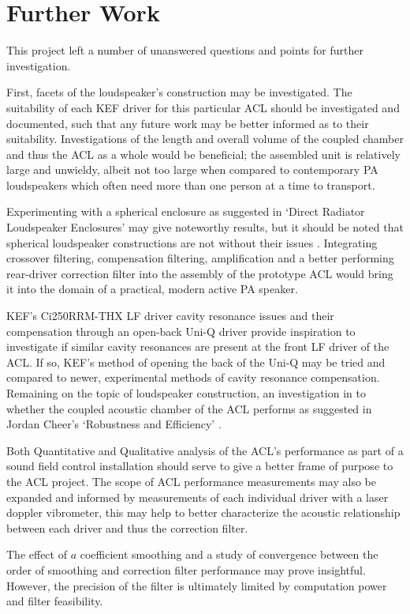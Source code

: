 \documentclass{report}
\begin{document}
\chapter{Further Work}
    This project left a number of unanswered questions and points for further investigation.

    First, facets of the loudspeaker's construction may be investigated.
    The suitability of each KEF driver for this particular ACL should be investigated and documented, such that any future work may be better informed as to their suitability.
    Investigations of the length and overall volume of the coupled chamber and thus the ACL as a whole would be beneficial; the assembled unit is relatively large and unwieldy, albeit not too large when compared to contemporary PA loudspeakers which often need more than one person at a time to transport.
    
    Experimenting with a spherical enclosure as suggested in `Direct Radiator Loudspeaker Enclosures' may give noteworthy results, but it should be noted that spherical loudspeaker constructions are not without their issues \cite{olson1969direct}.
    Integrating crossover filtering, compensation filtering, amplification and a better performing rear-driver correction filter into the assembly of the prototype ACL would bring it into the domain of a practical, modern active PA speaker.
    
    KEF's Ci250RRM-THX LF driver cavity resonance issues and their compensation through an open-back Uni-Q driver provide inspiration to investigate if similar cavity resonances are present at the front LF driver of the ACL.
    If so, KEF's method of opening the back of the Uni-Q may be tried and compared to newer, experimental methods of cavity resonance compensation.
    Remaining on the topic of loudspeaker construction, an investigation in to whether the coupled acoustic chamber of the ACL performs as suggested in Jordan Cheer's `Robustness and Efficiency' \cite{cheer2015robustness}.
    
    Both Quantitative and Qualitative analysis of the ACL's performance as part of a sound field control installation should serve to give a better frame of purpose to the ACL project.
    The scope of ACL performance measurements may also be expanded and informed by measurements of each individual driver with a laser doppler vibrometer, this may help to better characterize the acoustic relationship between each driver and thus the correction filter.
    
    The effect of $a$ coefficient smoothing and a study of convergence between the order of smoothing and correction filter performance may prove insightful.
    However, the precision of the filter is ultimately limited by computation power and filter feasibility.
\end{document}
